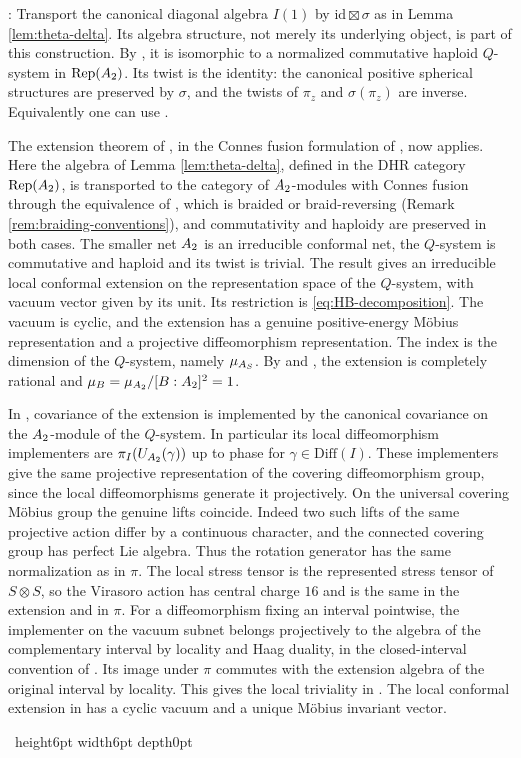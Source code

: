 \documentclass[leqno]{article}
\let\cal\relax
\newcommand{\cal}{\mathcal}
\newcommand{\qed}{\hfill \vrule height6pt  width6pt depth0pt}
\newcommand{\ot}{\otimes}
\DeclareMathOperator{\Rep}{Rep}
\newenvironment{proof}[1][]{\noindent {\it Proof #1} : }{\hbox{~}\qed
\smallskip
}
\numberwithin{equation}{section}
\begin{document}
\begin{proof}
Transport the canonical diagonal algebra $I(1)$ by $\mathrm{id}\boxtimes\sigma$ as in Lemma \ref{lem:theta-delta}. Its algebra structure, not merely its underlying object, is part of this construction. By \cite[Theorems 3.2 and 3.9]{CGGH23}, it is isomorphic to a normalized commutative haploid $Q$-system in $\Rep(\cal A_2)$. Its twist is the identity: the canonical positive spherical structures are preserved by $\sigma$, and the twists of $\pi_z$ and $\sigma(\pi_z)$ are inverse. Equivalently one can use \cite[Proposition 2.22]{CGGH23}.

The extension theorem of \cite[Theorems 2.6, p.~11, and 5.7, p.~26]{GuiF25}, in the Connes fusion formulation of \cite[Theorem 4.9]{LoR95}, now applies. Here the algebra of Lemma \ref{lem:theta-delta}, defined in the DHR category $\Rep(\cal A_2)$, is transported to the category of $\cal A_2$-modules with Connes fusion through the equivalence of \cite[Theorem 6.6 p.~77]{Gui21a}, which is braided or braid-reversing (Remark \ref{rem:braiding-conventions}), and commutativity and haploidy are preserved in both cases. The smaller net $\cal A_2$ is an irreducible conformal net, the $Q$-system is commutative and haploid and its twist is trivial. The result gives an irreducible local conformal extension on the representation space of the $Q$-system, with vacuum vector given by its unit. Its restriction is \eqref{eq:HB-decomposition}. The vacuum is cyclic, and the extension has a genuine positive-energy M\"obius representation and a projective diffeomorphism representation. The index is the dimension of the $Q$-system, namely $\mu_{\cal A_S}$. By \cite[Theorem 24]{Lon03} and \cite[Proposition 24]{KLM01}, the extension is completely rational and $\mu_{\cal B} = \mu_{\cal A_2}/[\cal B:\cal A_2]^2 = 1$.

In \cite[Theorem 2.6]{GuiF25}, covariance of the extension is implemented by the canonical covariance on the $\cal A_2$-module of the $Q$-system. In particular its local diffeomorphism implementers are $\pi_I(U_{\cal A_2}(\gamma))$ up to phase for $\gamma\in\mathrm{Diff}(I)$. These implementers give the same projective representation of the covering diffeomorphism group, since the local diffeomorphisms generate it projectively. On the universal covering M\"obius group the genuine lifts coincide. Indeed two such lifts of the same projective action differ by a continuous character, and the connected covering group has perfect Lie algebra. Thus the rotation generator has the same normalization as in $\pi$. The local stress tensor is the represented stress tensor of $S\ot S$, so the Virasoro action has central charge $16$ and is the same in the extension and in $\pi$. For a diffeomorphism fixing an interval pointwise, the implementer on the vacuum subnet belongs projectively to the algebra of the complementary interval by locality and Haag duality, in the closed-interval convention of \cite[Section 2 p.~7]{HeT25}. Its image under $\pi$ commutes with the extension algebra of the original interval by locality. This gives the local triviality in \cite[Definition 2.3]{HeT26}. The local conformal extension in \cite[Theorem 5.7]{GuiF25} has a cyclic vacuum and a unique M\"obius invariant vector.


\end{proof}
\end{document}
